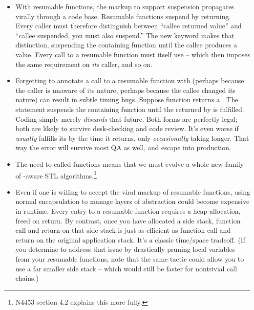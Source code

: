 \begin{itemize}
    \item With resumable functions, the markup to support suspension
          propagates virally through a code base. Resumable functions suspend
          by returning. Every caller must therefore distinguish between
          ``callee returned value'' and ``callee suspended, you must also
          suspend.'' The new  keyword makes that distinction,
          suspending the containing function until the callee produces a
          value. Every call to a resumable function must itself
          use  -- which then imposes the same requirement
          on \emph{its} caller, and so on.
    \item Forgetting to annotate a call to a resumable function
          with  (perhaps because the caller is unaware of its
          nature, perhaps because the callee changed its nature) can result in
          subtle timing bugs. Suppose function  returns
          a . The statement  suspends
          the containing function until the  returned by 
          is fulfilled. Coding simply  merely \emph{discards} that
          future. Both forms are perfectly legal; both are likely to survive
          desk-checking and code review. It's even worse
          if  \emph{usually} fulfills its  by the time it
          returns, only \emph{occasionally} taking longer. That way the error
          will survive most QA as well, and escape into production.
    \item The need to  called functions means that we must evolve a
          whole new family of -aware STL
          algorithms.\footnote{N4453\cite{N4453} section 4.2 explains this
          more fully.}
    \item Even if one is willing to accept the viral  markup of
          resumable functions, using normal encapsulation to manage layers of
          abstraction could become expensive in runtime. Every entry to a
          resumable function requires a heap allocation, freed on return. By
          contrast, once you have allocated a side stack, function call and
          return on that side stack is just as efficient as function call and
          return on the original application stack. It's a classic time/space
          tradeoff. (If you determine to address that issue by drastically
          pruning local variables from your resumable functions, note that the
          same tactic could allow you to use a far smaller side stack -- which
          would still be faster for nontrivial call chains.)
\end{itemize}
